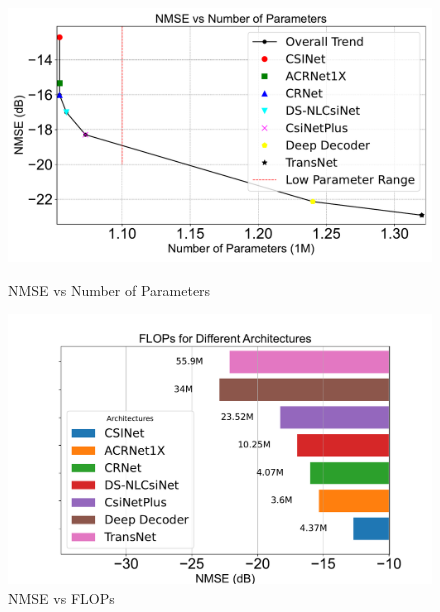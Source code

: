 \documentclass[lettersize,journal]{IEEEtran}
\begin{document}
\begin{figure}[!t] %
	\centering
	\begin{minipage}[b]{0.45\textwidth} %
		\centering
		\includegraphics[width=\textwidth]{NMSEvsNofparametters.pdf}
		\caption{NMSE vs Number of Parameters}
		\label{fig:nmse-params}
	\end{minipage}
	\hfill
	\begin{minipage}[b]{0.4\textwidth} %
		\centering
		\includegraphics[width=\textwidth]{NMSEvsFLOPs.pdf}
		\caption{NMSE vs FLOPs}
		\label{fig:nmse-flops}
	\end{minipage}
\end{figure}
\end{document}
